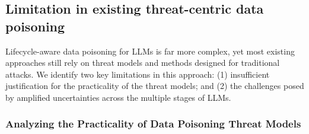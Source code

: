 \subsection{Limitation in existing threat-centric data poisoning}\label{sec:limitation}

Lifecycle-aware data poisoning for LLMs is far more complex, yet most existing approaches still rely on threat models and methods designed for traditional attacks. We identify two key limitations in this approach: (1) insufficient justification for the practicality of the threat models; and (2) the challenges posed by amplified uncertainties across the multiple stages of LLMs.

\subsubsection{Analyzing the Practicality of Data Poisoning Threat Models} 

